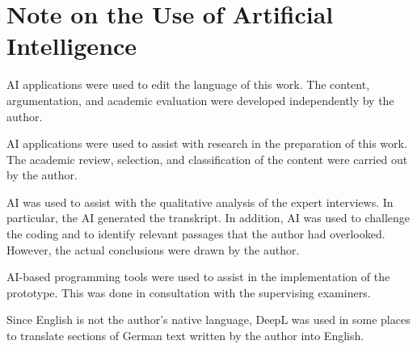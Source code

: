 \chapter*{Note on the Use of Artificial Intelligence}

AI applications were used to edit the language of this work. The content, argumentation,
and academic evaluation were developed independently by the author.

AI applications were used to assist with research in the preparation of this work. The
academic review, selection, and classification of the content were carried out by the author.

AI was used to assist with the qualitative analysis of the expert interviews. In particular, the AI generated
the transkript. In addition, AI was used to challenge the coding and to identify relevant passages that the
author had overlooked. However, the actual conclusions were drawn by the author.

AI-based programming tools were used to assist in the implementation of the prototype. This
was done in consultation with the supervising examiners.

Since English is not the author’s native language, DeepL \cite{DeepLAIPlatform} was used in some places to
translate sections of German text written by the author into English.




